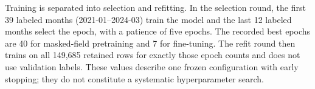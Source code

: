 Training is separated into selection and refitting.  In the selection round, the first 39 labeled months (2021-01--2024-03) train the model and the last 12 labeled months select the epoch, with a patience of five epochs.  The recorded best epochs are 40 for masked-field pretraining and 7 for fine-tuning.  The refit round then trains on all 149,685 retained rows for exactly those epoch counts and does not use validation labels.  These values describe one frozen configuration with early stopping; they do not constitute a systematic hyperparameter search.
